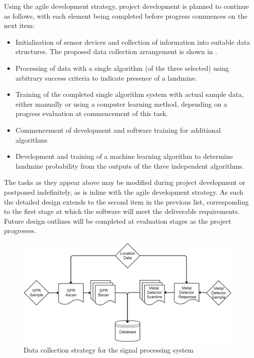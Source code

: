 \documentclass[main.tex]{subfiles}
\begin{document}
Using the agile development strategy, project development is planned to continue as follows, with each element being completed before progress commences on the next item:
\begin{itemize}
\item Initialisation of sensor devices and collection of information into suitable data structures. The proposed data collection arrangement is shown in .
\item Processing of data with a single algorithm (of the three selected) using arbitrary success criteria to indicate presence of a landmine.
\item Training of the completed single algorithm system with actual sample data, either manually or using a computer learning method, depending on a progress evaluation at commencement of this task.
\item Commencement of development and software training for additional algorithms
\item Development and training of a machine learning algorithm to determine landmine probability from the outputs of the three independent algorithms.
\end{itemize}

The tasks as they appear above may be modified during project development or postponed indefinitely, as is inline with the agile development strategy. As such the detailed design extends to the second item in the previous list, corresponding to the first stage at which the software will meet the deliverable requirements. Future design outlines will be completed at evaluation stages as the project progresses.

\begin{figure}[ht]
\includegraphics[width=\textwidth]{4-DetailedDesign/data-management.png}
\centering
\caption{Data collection strategy for the signal processing system}
\end{figure}
\end{document}
